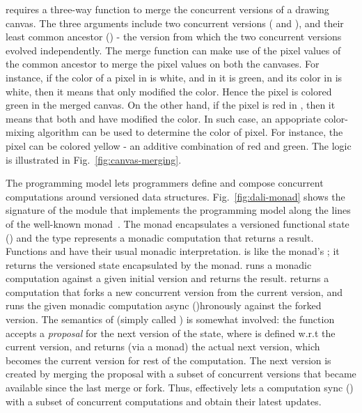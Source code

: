 \name requires a three-way  function to merge the concurrent
versions of a drawing canvas. The three arguments include two
concurrent versions ( and ), and their least common
ancestor () - the version from which the two concurrent
versions evolved independently. The merge function can make use of the
pixel values of the common ancestor to merge the pixel values on both
the canvases. For instance, if the color of a pixel in  is white,
and in  it is green, and its color in  is
white, then it means that only  modified the color. Hence the
pixel is colored green in the merged canvas. On the other hand, if the
pixel is red in , then it means that both
 and  have modified the color. In such case, an appopriate
color-mixing algorithm can be used to determine the color of pixel.
For instance, the pixel can be colored yellow - an additive
combination of red and green. The logic is illustrated in
Fig.~\ref{fig:canvas-merging}.

The \name programming model lets programmers define and compose
concurrent computations around versioned data structures.
Fig.~\ref{fig:dali-monad} shows the signature of the \name module that
implements the programming model along the lines of the well-known
 monad~\cite{wadler-monad}. The monad encapsulates a
versioned functional state () and the type 
represents a monadic computation that returns a  result.
Functions  and  have their usual monadic
interpretation.  is like the 
monad's ; it returns the versioned state encapsulated by the
monad.  runs a monadic computation against
a given initial version and returns the result. 
returns a computation that forks a new concurrent version from the
current version, and runs the given monadic computation async ()hronously
against the forked version.  The semantics of 
(simply called ) is somewhat involved: the function accepts a
\emph{proposal} for the next version of the state, where  is
defined w.r.t the current version, and returns (via a monad) the
actual next version, which becomes the current version for rest of the
computation.  The next version is created by merging the proposal with
a subset of concurrent versions that became available since the last
merge or fork. Thus,  effectively lets a computation sync
() with a subset of concurrent computations and obtain their latest
updates.

